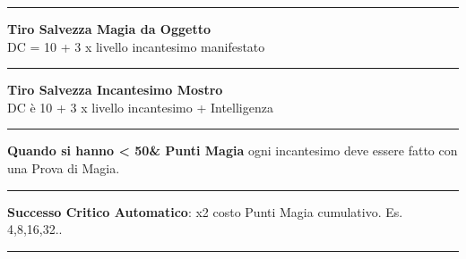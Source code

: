 \documentclass[a4paper,12 pt,openany]{book}
\newcommand{\riga}{\rule{\textwidth}{0.4pt}}
\begin{document}
\begin{textblock*}{5cm}
\riga

\textbf{Tiro Salvezza Magia da Oggetto}\\
DC = 10 + 3 x livello incantesimo manifestato

\riga

\textbf{Tiro Salvezza Incantesimo Mostro}\\
DC è 10 + 3 x livello incantesimo + Intelligenza

\riga

\textbf{Quando si hanno < 50\& Punti Magia} ogni incantesimo deve essere fatto con una Prova di Magia.

\riga

\textbf{Successo Critico Automatico}:  x2 costo Punti Magia cumulativo. Es. 4,8,16,32..

\riga

\end{textblock*}
\end{document}
